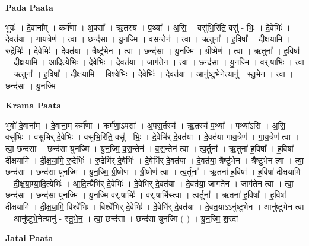 \documentclass[17pt]{extarticle}
\begin{document}
\textbf{Pada Paata} \newline

भुवः॑ । दे॒वाना᳚म् । कर्म॑णा । अ॒पसा᳚ । ऋ॒तस्य॑ । प॒थ्या᳚ । अ॒सि॒ । वसु॑भि॒रिति॒ वसु॑ - भिः॒ । दे॒वेभिः॑ । दे॒वत॑या । गा॒य॒त्रेण॑ । त्वा॒ । छन्द॑सा । यु॒न॒ज्मि॒ । व॒स॒न्तेन॑ । त्वा॒ । ऋ॒तुना᳚ । ह॒विषा᳚ । दी॒क्ष॒या॒मि॒ । रु॒द्रेभिः॑ । दे॒वेभिः॑ । दे॒वत॑या । त्रैष्टु॑भेन । त्वा॒ । छन्द॑सा । यु॒न॒ज्मि॒ । ग्री॒ष्मेण॑ । त्वा॒ । ऋ॒तुना᳚ । ह॒विषा᳚ । दी॒क्ष॒या॒मि॒ । आ॒दि॒त्येभिः॑ । दे॒वेभिः॑ । दे॒वत॑या । जाग॑तेन । त्वा॒ । छन्द॑सा । यु॒न॒ज्मि॒ । व॒र्॒.षाभिः॑ । त्वा॒ । ऋ॒तुना᳚ । ह॒विषा᳚ । दी॒क्ष॒या॒मि॒ । विश्वे॑भिः । दे॒वेभिः॑ । दे॒वत॑या । आनु॑ष्टुभे॒नेत्यानु॑ - स्तु॒भे॒न॒ । त्वा॒ । छन्द॑सा । यु॒न॒ज्मि॒ ।  \newline


\textbf{Krama Paata} \newline

भुवो॑ दे॒वाना᳚म् । दे॒वाना॒म् कर्म॑णा । कर्म॑णा॒ऽपसा᳚ । अ॒पस॒र्तस्य॑ । ऋ॒तस्य॑ प॒थ्या᳚ । पथ्या॑ऽसि । अ॒सि॒ वसु॑भिः । वसु॑भिर् दे॒वेभिः॑ । वसु॑भि॒रिति॒ वसु॑ - भिः॒ । दे॒वेभि॑र् दे॒वत॑या । दे॒वत॑या गाय॒त्रेण॑ । गा॒य॒त्रेण॑ त्वा । त्वा॒ छन्द॑सा । छन्द॑सा युनज्मि । यु॒न॒ज्मि॒ व॒स॒न्तेन॑ । व॒स॒न्तेन॑ त्वा । त्व॒र्तुना᳚ । ऋ॒तुना॑ ह॒विषा᳚ । ह॒विषा॑ दीक्षयामि । दी॒क्ष॒या॒मि॒ रु॒द्रेभिः॑ । रु॒द्रेभि॑र् दे॒वेभिः॑ । दे॒वेभि॑र् दे॒वत॑या । दे॒वत॑या॒ त्रैष्टु॑भेन । त्रैष्टु॑भेन त्वा । त्वा॒ छन्द॑सा । छन्द॑सा युनज्मि । यु॒न॒ज्मि॒ ग्री॒ष्मेण॑ । ग्री॒ष्मेण॑ त्वा । त्व॒र्तुना᳚ । ऋ॒तना॑ ह॒विषा᳚ । ह॒विषा॑ दीक्षयामि । दी॒क्ष॒या॒म्या॒दि॒त्येभिः॑ । आ॒दि॒त्यैभि॑र् दे॒वेभिः॑ । दे॒वेभि॑र् दे॒वत॑या । दे॒वत॑या॒ जाग॑तेन । जाग॑तेन त्वा । त्वा॒ छन्द॑सा । छन्द॑सा युनज्मि । यु॒न॒ज्मि॒ व॒र्॒.षाभिः॑ । व॒र्॒.षाभि॑स्त्वा । त्व॒र्तुना᳚ । ऋ॒तना॑ ह॒विषा᳚ । ह॒विषा॑ दीक्षयामि । दी॒क्ष॒या॒मि॒ विश्वे॑भिः । विश्वे॑भिर् दे॒वेभिः॑ । दे॒वेभि॑र् दे॒वत॑या । दे॒वत॒याऽऽनु॑ष्टुभेन । आनु॑ष्टुभेन त्वा । आनु॑ष्टुभे॒नेत्यानु॑ - स्तु॒भे॒न॒ । त्वा॒ छन्द॑सा । छन्द॑सा युनज्मि ( ) । यु॒न॒ज्मि॒ श॒रदा᳚ \newline

\textbf{Jatai Paata} \newline
\end{document}
